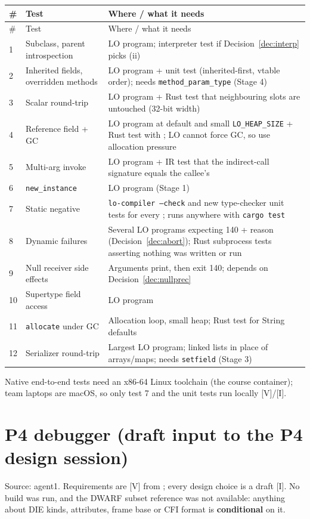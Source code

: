 \documentclass[10pt]{article}
\newcommand{\code}[1]{\texttt{\small #1}}
\newcommand{\mV}{\textsf{\scriptsize[V]}}
\newcommand{\mI}{\textsf{\scriptsize[I]}}
\begin{document}
\begin{xltabular}{\linewidth}{@{}L{0.4cm}L{3.6cm}Y@{}}
\toprule
\# & Test & Where / what it needs \\
\midrule
\endfirsthead
\toprule \# & Test & Where / what it needs \\ \midrule
{} & Subclass, parent introspection & LO program; interpreter test if Decision~\ref{dec:interp} picks (ii) \\
2 & Inherited fields, overridden methods & LO program +  unit test (inherited-first, vtable order); needs \code{method\_param\_type} (Stage 4) \\
3 & Scalar round-trip & LO program + Rust test that neighbouring slots are untouched (32-bit width) \\
4 & Reference field + GC & LO program at default and small \code{LO\_HEAP\_SIZE} + Rust test with ; LO cannot force GC, so use allocation pressure \\
5 & Multi-arg invoke & LO program + IR test that the indirect-call signature equals the callee's \\
6 & \code{new\_instance} & LO program (Stage 1) \\
7 & Static negative & \code{lo-compiler --check} and new type-checker unit tests for every ; runs anywhere with \code{cargo test} \\
8 & Dynamic failures & Several LO programs expecting 140 + reason (Decision~\ref{dec:abort}); Rust subprocess tests asserting nothing was written or run \\
9 & Null receiver side effects & Arguments print, then exit 140; depends on Decision~\ref{dec:nullprec} \\
10 & Supertype field access & LO program \\
11 & \code{allocate} under GC & Allocation loop, small heap; Rust test for String defaults \\
12 & Serializer round-trip & Largest LO program; linked lists in place of arrays/maps; needs \code{setfield} (Stage 3) \\
\bottomrule
\end{xltabular}
Native end-to-end tests need an x86-64 Linux toolchain (the course container); team laptops are macOS, so only test 7 and the unit tests run locally \mV/\mI.

\section{P4 debugger (draft input to the P4 design session)}\label{sec:p4}
Source: agent1. Requirements are \mV{} from ; every design choice is a draft \mI. No build was run, and the DWARF subset reference was not available: anything about DIE kinds, attributes, frame base or CFI format is \textbf{conditional} on it.
\end{document}
